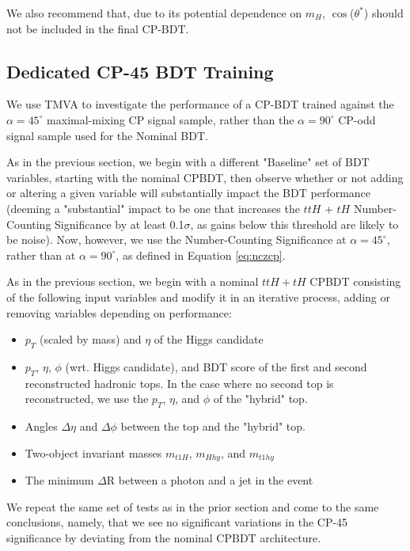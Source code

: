 We also recommend that, due to its potential dependence on $m_{H}$, $\cos$($\theta^{*}$) should not be included in the final CP-BDT.

\subsection{Dedicated CP-45 BDT Training}

We use TMVA to investigate the performance of a CP-BDT trained against the $\alpha = 45^{\circ}$ maximal-mixing CP signal sample, rather than the $\alpha = 90^{\circ}$ CP-odd signal sample used for the Nominal BDT.

As in the previous section, we begin with a different "Baseline" set of BDT variables, starting with the nominal CPBDT, then observe whether or not adding or altering a given variable will substantially impact the BDT performance (deeming a "substantial" impact to be one that increases the $ttH$ + $tH$ Number-Counting Significance by at least 0.1$\sigma$, as gains below this threshold are likely to be noise). Now, however, we use the Number-Counting Significance at $\alpha = 45^{\circ}$, rather than at $\alpha = 90^{\circ}$, as defined in Equation \ref{eq:nczcp}.

As in the previous section, we begin with a nominal $ttH+tH$ CPBDT consisting of the following input variables and modify it in an iterative process, adding or removing variables depending on performance:

\begin{itemize}
\item $p_{T}$ (scaled by mass) and $\eta$ of the Higgs candidate
\item $p_{T}$, $\eta$, $\phi$ (wrt. Higgs candidate), and BDT score of the first and second reconstructed hadronic tops. In the case where no second top is reconstructed, we use the $p_{T}$, $\eta$, and $\phi$ of the "hybrid" top.
\item Angles $\Delta\eta$ and $\Delta\phi$ between the top and the "hybrid" top.
\item Two-object invariant masses $m_{t1H}$, $m_{Hhy}$, and $m_{t1hy}$
\item The minimum $\Delta$R between a photon and a jet in the event
\end{itemize}

We repeat the same set of tests as in the prior section and come to the same conclusions, namely, that we see no significant variations in the CP-45 significance by deviating from the nominal CPBDT architecture.

